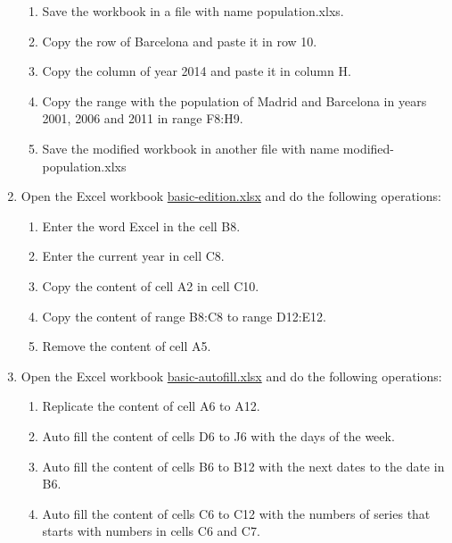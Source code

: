\begin{enumerate}[leftmargin=*]
\begin{enumerate}
\item Save the workbook in a file with name \textsf{population.xlxs}.
\item Copy the row of Barcelona and paste it in row 10. 
\item Copy the column of year 2014 and paste it in column H. 
\item Copy the range with the population of Madrid and Barcelona in years 2001, 2006 and 2011 in range F8:H9. 
\item Save the modified workbook in another file with name \textsf{modified-population.xlxs}
\end{enumerate}


\item Open the Excel workbook
\href{http://aprendeconalf.es/office/excel/exercises/introduction/basic-edition.xlsx}{\textsf{basic-edition.xlsx}} and
do the following operations:
\begin{enumerate}
\item Enter the word Excel in the cell B8.
\item Enter the current year in cell C8.
\item Copy the content of cell A2 in cell C10.
\item Copy the content of range B8:C8 to range D12:E12.
\item Remove the content of cell A5.
\end{enumerate}

\item Open the Excel workbook
\href{http://aprendeconalf.es/office/excel/exercises/introduction/basic-autofill.xlsx}{\textsf{basic-autofill.xlsx}} and
do the following operations:
\begin{enumerate}
\item Replicate the content of cell  A6 to A12.
\item Auto fill the content of cells D6 to J6 with the days of the week.
\item Auto fill the content of cells B6 to B12 with the next dates to the date in B6.
\item Auto fill the content of cells C6 to C12 with the numbers of series that starts with numbers in cells  C6 and C7.
\end{enumerate}


\end{enumerate}
